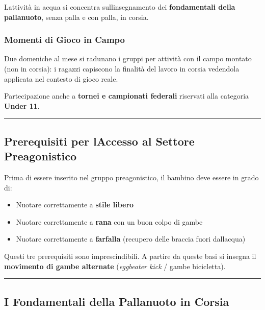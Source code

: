 \documentclass[a4paper,11pt]{article}
\providecommand{\tightlist}{%
  \setlength{\itemsep}{0pt}\setlength{\parskip}{0pt}}
\begin{document}
L\textquotesingle attività in acqua si concentra
sull\textquotesingle insegnamento dei \textbf{fondamentali della
      pallanuoto}, senza palla e con palla, in corsia.

\subsubsection{Momenti di Gioco in
      Campo}\label{momenti-di-gioco-in-campo}

Due domeniche al mese si radunano i gruppi per attività con il campo
montato (non in corsia): i ragazzi capiscono la finalità del lavoro in
corsia vedendola applicata nel contesto di gioco reale.

Partecipazione anche a \textbf{tornei e campionati federali} riservati
alla categoria \textbf{Under 11}.

\begin{center}\rule{0.5\linewidth}{0.5pt}\end{center}

\subsection{Prerequisiti per l\textquotesingle Accesso al Settore
      Preagonistico}\label{prerequisiti-per-laccesso-al-settore-preagonistico}

Prima di essere inserito nel gruppo preagonistico, il bambino deve
essere in grado di:

\begin{itemize}
      \tightlist
      \item
            Nuotare correttamente a \textbf{stile libero}
      \item
            Nuotare correttamente a \textbf{rana} con un buon colpo di gambe
      \item
            Nuotare correttamente a \textbf{farfalla} (recupero delle braccia
            fuori dall\textquotesingle acqua)
\end{itemize}

Questi tre prerequisiti sono imprescindibili. A partire da queste basi
si insegna il \textbf{movimento di gambe alternate} (\emph{eggbeater
      kick} / gambe bicicletta).

\begin{center}\rule{0.5\linewidth}{0.5pt}\end{center}

\subsection{I Fondamentali della Pallanuoto in
      Corsia}\label{i-fondamentali-della-pallanuoto-in-corsia}
\end{document}
